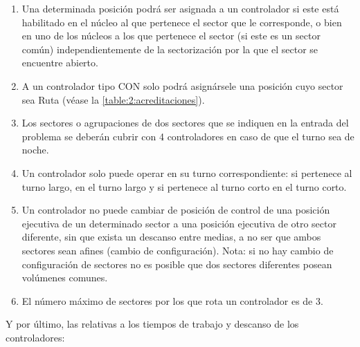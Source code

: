 \begin{enumerate}[resume*]
	\item \label{RD:acreditacion-valida} Una determinada posición podrá ser asignada a un controlador si este está habilitado en el núcleo al que pertenece el sector que le corresponde, o bien en uno de los núcleos a los que pertenece el sector
	(si este es un sector común) independientemente de la sectorización por la que el sector se encuentre abierto.
	
	\item A un controlador tipo CON solo podrá asignársele una posición cuyo sector sea Ruta (véase la \autoref{table:2:acreditaciones}).
	
	\item Los sectores o agrupaciones de dos sectores que se indiquen en la entrada del problema se deberán cubrir con 4 controladores en caso de que el turno sea de noche.
	
	\item Un controlador solo puede operar en su turno correspondiente: si pertenece al turno largo, en el turno largo y si pertenece al turno corto en el turno corto.
	
	\item Un controlador no puede cambiar de posición de control de una posición ejecutiva de un determinado sector a una posición ejecutiva de otro sector diferente, sin que exista un descanso entre medias, a no ser que ambos sectores sean afines (cambio de configuración). Nota: si no hay cambio de configuración de sectores no es posible que dos sectores diferentes posean volúmenes comunes.
	
	\item El número máximo de sectores por los que rota un controlador es de 3.	
\end{enumerate}



Y por último, las relativas a los tiempos de trabajo y descanso de los controladores:

